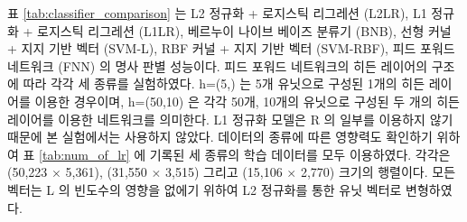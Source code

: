 \documentclass[oneside, ko,phd]{snuthesis_utf8_kor}
\begin{document}
표 \ref{tab:classifier_comparison} 는 L2 정규화 + 로지스틱 리그레션 (L2LR), L1 정규화 + 로지스틱 리그레션 (L1LR), 베르누이 나이브 베이즈 분류기 (BNB), 선형 커널 + 지지 기반 벡터 (SVM-L), RBF 커널 + 지지 기반 벡터 (SVM-RBF), 피드 포워드 네트워크 (FNN) 의 명사 판별 성능이다.
피드 포워드 네트워크의 히든 레이어의 구조에 따라 각각 세 종류를 실험하였다.
h=(5,) 는 5개 유닛으로 구성된 1개의 히든 레이어를 이용한 경우이며, h=(50,10) 은 각각 50개, 10개의 유닛으로 구성된 두 개의 히든 레이어를 이용한 네트워크를 의미한다.
L1 정규화 모델은 R 의 일부를 이용하지 않기 때문에 본 실험에서는 사용하지 않았다.
데이터의 종류에 따른 영향력도 확인하기 위하여 표 \ref{tab:num_of_lr} 에 기록된 세 종류의 학습 데이터를 모두 이용하였다.
각각은  (50,223 $\times$ 5,361), (31,550 $\times$ 3,515) 그리고 (15,106 $\times$ 2,770) 크기의 행렬이다.
모든 벡터는 L 의 빈도수의 영향을 없에기 위하여 L2 정규화를 통한 유닛 벡터로 변형하였다.
\end{document}
